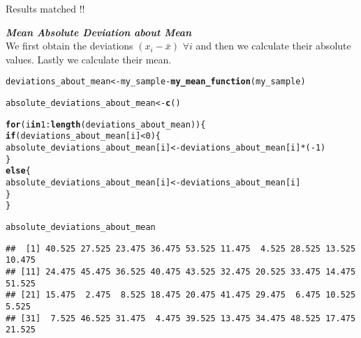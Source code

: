 \documentclass[11pt, a4paper]{article}\usepackage[]{graphicx}\usepackage[]{xcolor}
\makeatletter
\newcommand{\hlnum}[1]{\textcolor[rgb]{0.686,0.059,0.569}{#1}}%
\newcommand{\hlopt}[1]{\textcolor[rgb]{0,0,0}{#1}}%
\newcommand{\hldef}[1]{\textcolor[rgb]{0.345,0.345,0.345}{#1}}%
\newcommand{\hlkwa}[1]{\textcolor[rgb]{0.161,0.373,0.58}{\textbf{#1}}}%
\newcommand{\hlkwb}[1]{\textcolor[rgb]{0.69,0.353,0.396}{#1}}%
\newcommand{\hlkwd}[1]{\textcolor[rgb]{0.737,0.353,0.396}{\textbf{#1}}}%
\newenvironment{kframe}{%
 \def\at@end@of@kframe{}%
 \ifinner\ifhmode%
  \def\at@end@of@kframe{\end{minipage}}%
  \begin{minipage}{\columnwidth}%
 \fi\fi%
 \def\FrameCommand##1{\hskip\@totalleftmargin \hskip-\fboxsep
 \colorbox{shadecolor}{##1}\hskip-\fboxsep
     \hskip-\linewidth \hskip-\@totalleftmargin \hskip\columnwidth}%
 \MakeFramed {\advance\hsize-\width
   \@totalleftmargin\z@ \linewidth\hsize
   \@setminipage}}%
 {\par\unskip\endMakeFramed%
 \at@end@of@kframe}
\newenvironment{knitrout}{}{} %
\makeatother
\begin{document}
\faCheckCircle[regular] Results matched !! \\

\newpage

\faArrowAltCircleRight[regular] \textit{\textbf{Mean Absolute Deviation about Mean}} \\

We first obtain the deviations $(x_i - \bar{x}) \,\, \forall i$ and then we calculate their absolute values. Lastly we calculate their mean.

\begin{knitrout}\footnotesize
{}\color{fgcolor}\begin{kframe}
\begin{alltt}
\hldef{deviations_about_mean} \hlkwb{<-} \hldef{my_sample} \hlopt{-} \hlkwd{my_mean_function}\hldef{(my_sample)}

\hldef{absolute_deviations_about_mean} \hlkwb{<-} \hlkwd{c}\hldef{()}

\hlkwa{for} \hldef{(i} \hlkwa{in} \hlnum{1}\hlopt{:}\hlkwd{length}\hldef{(deviations_about_mean)) \{}
  \hlkwa{if}\hldef{(deviations_about_mean[i]} \hlopt{<} \hlnum{0}\hldef{)\{}
    \hldef{absolute_deviations_about_mean[i]} \hlkwb{<-} \hldef{deviations_about_mean[i]} \hlopt{*} \hldef{(}\hlopt{-}\hlnum{1}\hldef{)}
  \hldef{\}}
  \hlkwa{else}\hldef{\{}
    \hldef{absolute_deviations_about_mean[i]} \hlkwb{<-} \hldef{deviations_about_mean[i]}
  \hldef{\}}
\hldef{\}}
\end{alltt}
\end{kframe}
\end{knitrout}

\begin{knitrout}\footnotesize
{}\color{fgcolor}\begin{kframe}
\begin{alltt}
\hldef{absolute_deviations_about_mean}
\end{alltt}
\begin{verbatim}
##  [1] 40.525 27.525 23.475 36.475 53.525 11.475  4.525 28.525 13.525 10.475
## [11] 24.475 45.475 36.525 40.475 43.525 32.475 20.525 33.475 14.475 51.525
## [21] 15.475  2.475  8.525 18.475 20.475 41.475 29.475  6.475 10.525  5.525
## [31]  7.525 46.525 31.475  4.475 39.525 13.475 34.475 48.525 17.475 21.525
\end{verbatim}
\end{kframe}
\end{knitrout}
\end{document}

